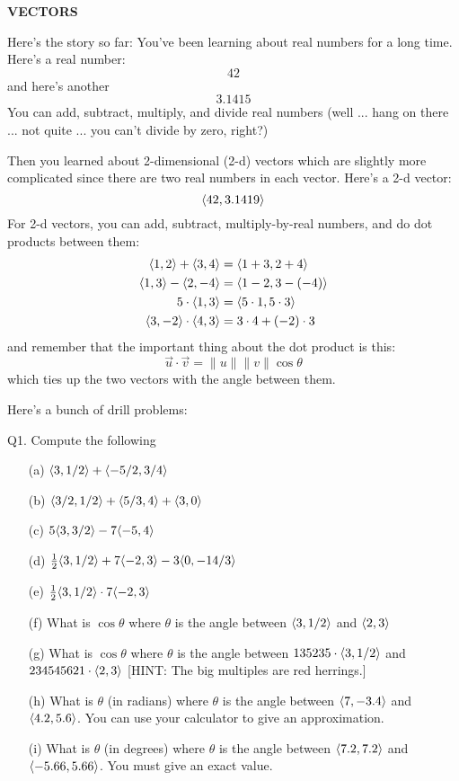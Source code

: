 \newpage

{\bf VECTORS}

Here's the story so far: You've been learning about real numbers
for a long time. Here's a real number:
\[
42
\]
and here's another
\[
3.1415
\]
You can add, subtract, multiply, and divide real numbers 
(well ... hang on there ... not quite ... you can't divide by zero, right?)

Then you learned about 
2-dimensional (2-d) vectors which 
are slightly more complicated since there are
two real numbers in each vector.
Here's a 2-d vector:
\[
\langle 42, 3.1419 \rangle
\]
For 2-d vectors, you can add, subtract, multiply-by-real numbers, 
and do dot products between them:
\begin{align*}
\langle 1, 2 \rangle + \langle 3, 4 \rangle &= \langle 1+3, 2+4 \rangle \\
\langle 1, 3 \rangle - \langle 2, -4 \rangle &= \langle 1-2, 3-(-4) \rangle \\
5 \cdot \langle 1, 3 \rangle &= \langle 5 \cdot 1, 5 \cdot 3 \rangle \\
\langle 3, -2 \rangle \cdot \langle 4, 3 \rangle &= 3\cdot 4 + (-2) \cdot 3 \\
\end{align*}
and remember that the important thing about the dot product is this:
\[
\vec{u} \cdot \vec{v} = \| u \| \| v \| \cos \theta
\]
which ties up the two vectors with the angle between them.

Here's a bunch of drill problems:

\newpage

Q1. Compute the following
\begin{enumerate}
\item[(a)] $ \langle 3, 1/2 \rangle + \langle -5/2, 3/4 \rangle $
\item[(b)] $\langle 3/2, 1/2 \rangle + \langle 5/3, 4 \rangle + \langle 3, 0 \rangle$
\item[(c)] $5\langle 3, 3/2 \rangle - 7\langle -5, 4 \rangle$
\item[(d)] $\frac{1}{2} \langle 3, 1/2 \rangle + 7 \langle -2, 3 \rangle - 3 \langle 0, -14/3 \rangle$
\item[(e)] $\frac{1}{2} \langle 3, 1/2 \rangle \cdot 7 \langle -2, 3 \rangle$
\item[(f)] What is $\cos\theta$ where $\theta$ is the angle between
$\langle 3, 1/2 \rangle$ and $\langle 2, 3 \rangle$
\item[(g)] What is $\cos\theta$ where $\theta$ is the angle between
$135235\cdot \langle 3, 1/2 \rangle$ and $234545621\cdot \langle 2, 3 \rangle$
[HINT: The big multiples are red herrings.]
\item[(h)] What is $\theta$ (in radians) where $\theta$ is the angle between
$\langle 7, -3.4 \rangle$ and $\langle 4.2, 5.6 \rangle$.
You can use your calculator to give an approximation.
\item[(i)] What is $\theta$ (in degrees) where $\theta$ is the angle between
$\langle 7.2, 7.2 \rangle$ and $\langle -5.66, 5.66 \rangle$.
You must give an exact value.
\end{enumerate}

